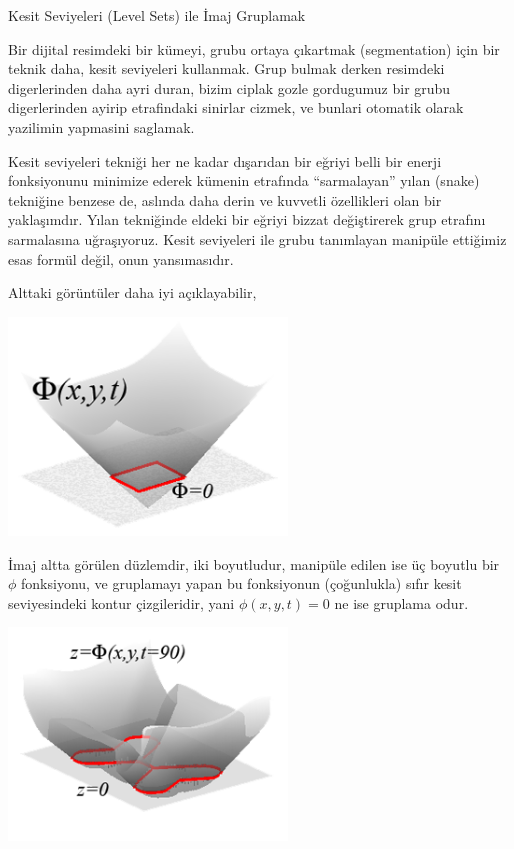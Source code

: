 \documentclass[12pt,fleqn]{article}\usepackage{../../common}
\begin{document}
Kesit Seviyeleri (Level Sets) ile İmaj Gruplamak 

Bir dijital resimdeki bir kümeyi, grubu ortaya çıkartmak (segmentation) için bir
teknik daha, kesit seviyeleri kullanmak. Grup bulmak derken resimdeki
digerlerinden daha ayri duran, bizim ciplak gozle gordugumuz bir grubu
digerlerinden ayirip etrafindaki sinirlar cizmek, ve bunlari otomatik
olarak yazilimin yapmasini saglamak. 

Kesit seviyeleri tekniği her ne kadar dışarıdan bir eğriyi belli bir enerji
fonksiyonunu minimize ederek kümenin etrafında ``sarmalayan'' yılan (snake)
tekniğine benzese de, aslında daha derin ve kuvvetli özellikleri olan bir
yaklaşımdır. Yılan tekniğinde eldeki bir eğriyi bizzat değiştirerek grup
etrafını sarmalasına uğraşıyoruz. Kesit seviyeleri ile grubu tanımlayan manipüle
ettiğimiz esas formül değil, onun yansımasıdır.

Alttaki görüntüler daha iyi açıklayabilir,

\includegraphics[width=20em]{compscieng_app50lset_02.png}

İmaj altta görülen düzlemdir, iki boyutludur, manipüle edilen ise üç boyutlu bir
$\phi$ fonksiyonu, ve gruplamayı yapan bu fonksiyonun (çoğunlukla) sıfır kesit
seviyesindeki kontur çizgileridir, yani $\phi(x,y,t) = 0$ ne ise gruplama odur.


\includegraphics[width=20em]{compscieng_app50lset_01.png}
\end{document}
